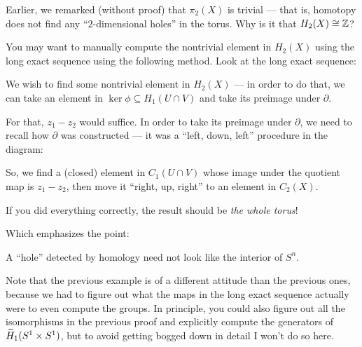 \begin{remark}
	Earlier, we remarked (without proof) that $\pi_2(X)$ is trivial --- that is, homotopy does not
	find any ``$2$-dimensional holes'' in the torus. Why is it that $H_2(X) \cong \mathbb Z$?

	You may want to manually compute the nontrivial element in $H_2(X)$ using the long
	exact sequence using the following method. Look at the long exact sequence:
	\begin{center}
	\end{center}
	We wish to find some nontrivial element in $H_2(X)$ --- in order to do that, we can take an
	element in $\ker \phi \subseteq H_1(U \cap V)$ and take its preimage under $\partial$.

	For that, $z_1 - z_2$ would suffice. In order to take its preimage under $\partial$, we need to
	recall how $\partial$ was constructed --- it was a ``left, down, left'' procedure in the
	diagram:
	\begin{center}
	\end{center}
	So, we find a (closed) element in $C_1(U \cap V)$ whose image under the quotient map is
	$z_1 - z_2$, then move it ``right, up, right'' to an element in $C_2(X)$.

	If you did everything correctly, the result should be \emph{the whole torus}!
\end{remark}
Which emphasizes the point:
\begin{moral}
	A ``hole'' detected by homology need not look like the interior of $S^n$.
\end{moral}

Note that the previous example is of a different attitude than the previous ones,
because we had to figure out what the maps in the long exact sequence actually were
to even compute the groups.
In principle, you could also figure out all the isomorphisms in the previous proof
and explicitly compute the generators of $\widetilde H_1(S^1 \times S^1)$,
but to avoid getting bogged down in detail I won't do so here.

